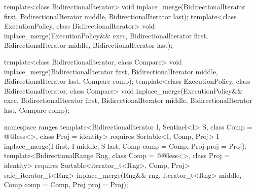 %
\begin{itemdecl}
template<class BidirectionalIterator>
  void inplace_merge(BidirectionalIterator first,
                     BidirectionalIterator middle,
                     BidirectionalIterator last);
template<class ExecutionPolicy, class BidirectionalIterator>
  void inplace_merge(ExecutionPolicy&& exec,
                     BidirectionalIterator first,
                     BidirectionalIterator middle,
                     BidirectionalIterator last);

template<class BidirectionalIterator, class Compare>
  void inplace_merge(BidirectionalIterator first,
                     BidirectionalIterator middle,
                     BidirectionalIterator last, Compare comp);
template<class ExecutionPolicy, class BidirectionalIterator, class Compare>
  void inplace_merge(ExecutionPolicy&& exec,
                     BidirectionalIterator first,
                     BidirectionalIterator middle,
                     BidirectionalIterator last, Compare comp);
\end{itemdecl}
\begin{addedblock}
\begin{itemdecl}
namespace ranges {
  template<BidirectionalIterator I, Sentinel<I> S, class Comp = @@less<>,
      class Proj = identity>
    requires Sortable<I, Comp, Proj>
    I inplace_merge(I first, I middle, S last, Comp comp = Comp{}, Proj proj = Proj{});
  template<BidirectionalRange Rng, class Comp = @@less<>, class Proj = identity>
    requires Sortable<iterator_t<Rng>, Comp, Proj>
    safe_iterator_t<Rng>
      inplace_merge(Rng&& rng, iterator_t<Rng> middle, Comp comp = Comp{},
                    Proj proj = Proj{});
}
\end{itemdecl}
\end{addedblock}

